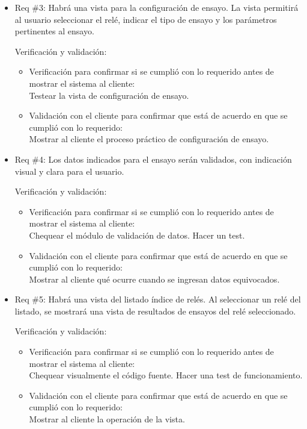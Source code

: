 \documentclass[11pt]{charter}
\begin{document}
\begin{itemize}
\item Req \#3: Habrá una vista para la configuración de ensayo. La vista permitirá al usuario seleccionar el relé, indicar el tipo de ensayo y los parámetros pertinentes al ensayo.

Verificación y validación:

\begin{itemize}
\item Verificación para confirmar si se cumplió con lo requerido antes de mostrar el sistema al cliente:\\
Testear la vista de configuración de ensayo.
\item Validación con el cliente para confirmar que está de acuerdo en que se cumplió con lo requerido:\\
Mostrar al cliente el proceso práctico de configuración de ensayo.
\end{itemize}


\item Req \#4: Los datos indicados para el ensayo serán validados, con indicación visual y clara para el usuario.

Verificación y validación:

\begin{itemize}
\item Verificación para confirmar si se cumplió con lo requerido antes de mostrar el sistema al cliente:\\
Chequear el módulo de validación de datos. Hacer un test.
\item Validación con el cliente para confirmar que está de acuerdo en que se cumplió con lo requerido:\\
Mostrar al cliente qué ocurre cuando se ingresan datos equivocados.
\end{itemize}


\item Req \#5: Habrá una vista del listado índice de relés. Al seleccionar un relé del listado, se mostrará una vista de resultados de ensayos del relé seleccionado.

Verificación y validación:

\begin{itemize}
\item Verificación para confirmar si se cumplió con lo requerido antes de mostrar el sistema al cliente:\\
Chequear visualmente el código fuente. Hacer una test de funcionamiento.
\item Validación con el cliente para confirmar que está de acuerdo en que se cumplió con lo requerido:\\
Mostrar al cliente la operación de la vista.
\end{itemize}



\end{itemize}
\end{document}
